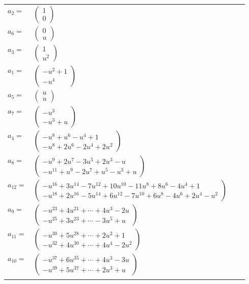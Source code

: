 \documentclass[1p]{elsarticle_modified}
\theoremstyle{definition}
\begin{document}
\begin{tabular}{m{7pt} m{180pt} m{7pt} m{180pt} }
\flushright $a_{2}=$&$\begin{pmatrix}1\\0\end{pmatrix}$ \\
\flushright $a_{6}=$&$\begin{pmatrix}0\\u\end{pmatrix}$ \\
\flushright $a_{3}=$&$\begin{pmatrix}1\\u^2\end{pmatrix}$ \\
\flushright $a_{1}=$&$\begin{pmatrix}- u^2+1\\- u^4\end{pmatrix}$ \\
\flushright $a_{5}=$&$\begin{pmatrix}u\\u\end{pmatrix}$ \\
\flushright $a_{7}=$&$\begin{pmatrix}- u^3\\- u^3+u\end{pmatrix}$ \\
\flushright $a_{4}=$&$\begin{pmatrix}- u^8+u^6- u^4+1\\- u^8+2 u^6-2 u^4+2 u^2\end{pmatrix}$ \\
\flushright $a_{8}=$&$\begin{pmatrix}- u^9+2 u^7-3 u^5+2 u^3- u\\- u^{11}+u^9-2 u^7+u^5- u^3+u\end{pmatrix}$ \\
\flushright $a_{12}=$&$\begin{pmatrix}- u^{16}+3 u^{14}-7 u^{12}+10 u^{10}-11 u^8+8 u^6-4 u^4+1\\- u^{18}+2 u^{16}-5 u^{14}+6 u^{12}-7 u^{10}+6 u^8-4 u^6+2 u^4- u^2\end{pmatrix}$ \\
\flushright $a_{9}=$&$\begin{pmatrix}- u^{23}+4 u^{21}+\cdots+4 u^3-2 u\\- u^{25}+3 u^{23}+\cdots-3 u^5+u\end{pmatrix}$ \\
\flushright $a_{11}=$&$\begin{pmatrix}- u^{30}+5 u^{28}+\cdots+2 u^2+1\\- u^{32}+4 u^{30}+\cdots+4 u^4-2 u^2\end{pmatrix}$ \\
\flushright $a_{10}=$&$\begin{pmatrix}- u^{37}+6 u^{35}+\cdots+4 u^3-3 u\\- u^{39}+5 u^{37}+\cdots+2 u^3+u\end{pmatrix}$\\&\end{tabular}
\end{document}
